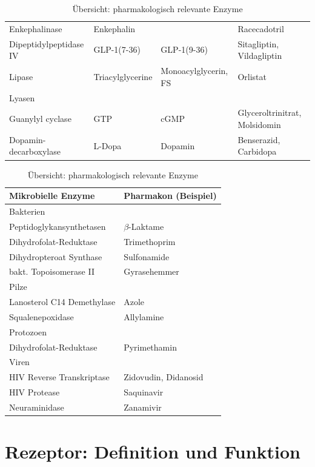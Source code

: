 \documentclass[10pt,a4paper]{report}
\begin{document}
\begin{table}[h]
\begin{longtable}{lp{}lp{4cm}}
		Enkephalinase&Enkephalin&&Racecadotril\\
		Dipeptidylpeptidase IV&GLP-1(7-36)&GLP-1(9-36)&Sitagliptin, Vildagliptin\\
		Lipase&Triacylglycerine&Monoacylglycerin, FS&Orlistat\\
		\addlinespace
		Lyasen&&&\\
		\midrule
		Guanylyl cyclase&GTP&cGMP&Glyceroltrinitrat, Molsidomin\\
		Dopamin-decarboxylase&L-Dopa&Dopamin&Benserazid, Carbidopa\\
		\bottomrule
	\end{longtable}
	\caption{Übersicht: pharmakologisch relevante Enzyme}
  	\label{tab:relevante_enzyme}
\end{table}

\begin{table}[h]
	\centering
	\begin{longtable}{ll}
		\toprule
		Mikrobielle Enzyme&Pharmakon (Beispiel)\\ 
		\midrule \addlinespace
		Bakterien&\\
		\midrule
		Peptidoglykansynthetasen&$\beta$-Laktame\\
		Dihydrofolat-Reduktase&Trimethoprim\\
		Dihydropteroat Synthase&Sulfonamide\\
		bakt. Topoisomerase II&Gyrasehemmer\\
		\addlinespace
		Pilze&\\  
		\midrule
		Lanosterol C14 Demethylase&Azole\\
		Squalenepoxidase&Allylamine\\
		Protozoen&\\
		Dihydrofolat-Reduktase&Pyrimethamin\\
		\addlinespace
		Viren&\\
		\midrule
		HIV Reverse Transkriptase&Zidovudin, Didanosid\\
		HIV Protease&Saquinavir\\
		Neuraminidase&Zanamivir\\
	\end{longtable}
	\caption{Übersicht: pharmakologisch relevante Enzyme}
 	\label{tab:relevante_enzyme}
\end{table}

\section{Rezeptor: Definition und Funktion}
\end{document}
